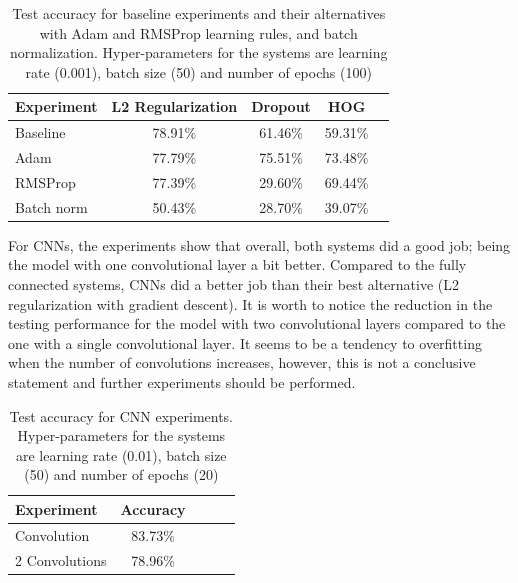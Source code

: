 \documentclass{article}
\begin{document}
\begin{table}[tb]
\vskip 3mm
\begin{center}
\begin{small}
\begin{sc}
\begin{tabular}{lcccr}
\hline
\abovespace\belowspace
Experiment & L2 Regularization & Dropout & HOG \\
\hline
\abovespace
Baseline	& 78.91\% & 61.46\% & 59.31\% \\
Adam    	& 77.79\% & 75.51\% & 73.48\% \\
RMSProp	 	& 77.39\% & 29.60\% & 69.44\% \\
Batch norm	& 50.43\% & 28.70\% & 39.07\% \\

\hline
\end{tabular}
\end{sc}
\end{small}
\caption{Test accuracy for baseline experiments and their alternatives with Adam and RMSProp learning rules, and batch normalization. Hyper-parameters for the systems are learning rate (0.001), batch size (50) and number of epochs (100)}
\label{tab:test_all}
\end{center}
\vskip -3mm
\end{table}

For CNNs, the experiments show that overall, both systems did a good job; being the model with one convolutional layer a bit better. Compared to the fully connected systems, CNNs did a better job than their best alternative (L2 regularization with gradient descent). It is worth to notice the reduction in the testing performance for the model with two convolutional layers compared to the one with a single convolutional layer. It seems to be a tendency to overfitting when the number of convolutions increases, however, this is not a conclusive statement and further experiments should be performed.

\begin{table}[tb]
\vskip 3mm
\begin{center}
\begin{small}
\begin{sc}
\begin{tabular}{lcccr}
\hline
\abovespace\belowspace
Experiment & Accuracy \\
\hline
\abovespace
1 Convolution	& 83.73\% \\
2 Convolutions 	& 78.96\% \\

\hline
\end{tabular}
\end{sc}
\end{small}
\caption{Test accuracy for CNN experiments. Hyper-parameters for the systems are learning rate (0.01), batch size (50) and number of epochs (20)}
\label{tab:test_cnn}
\end{center}
\vskip -3mm
\end{table}
\end{document}
